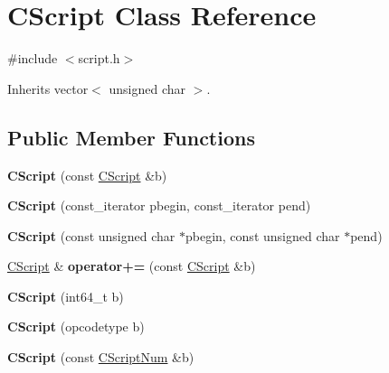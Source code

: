 \hypertarget{class_c_script}{}\section{C\+Script Class Reference}
\label{class_c_script}


{\ttfamily \#include $<$script.\+h$>$}



Inherits vector$<$ unsigned char $>$.

\subsection*{Public Member Functions}
\begin{DoxyCompactItemize}
\item 
\mbox{\label{class_c_script_a32037617a2648c826f3685d17a46d6cf}} 
{\bfseries C\+Script} (const \mbox{\hyperlink{class_c_script}{C\+Script}} \&b)
\item 
\mbox{\label{class_c_script_a06a47661695214630a2f41d4019b20f5}} 
{\bfseries C\+Script} (const\+\_\+iterator pbegin, const\+\_\+iterator pend)
\item 
\mbox{\label{class_c_script_aa8d9ad6ecd9662b423b73294783396ce}} 
{\bfseries C\+Script} (const unsigned char $\ast$pbegin, const unsigned char $\ast$pend)
\item 
\mbox{\label{class_c_script_af5c72a9c725a2c4f1432cc214d54cfd7}} 
\mbox{\hyperlink{class_c_script}{C\+Script}} \& {\bfseries operator+=} (const \mbox{\hyperlink{class_c_script}{C\+Script}} \&b)
\item 
\mbox{\label{class_c_script_a48cc35ec0c9119def402a7118e81cf00}} 
{\bfseries C\+Script} (int64\+\_\+t b)
\item 
\mbox{\label{class_c_script_a8214376dea81245d33a44a2ea7c2cdc3}} 
{\bfseries C\+Script} (opcodetype b)
\item 
\mbox{\label{class_c_script_a360223feeb0931931b8e8a5288dc4bd5}} 
{\bfseries C\+Script} (const \mbox{\hyperlink{class_c_script_num}{C\+Script\+Num}} \&b)
\item 
\mbox{\label{class_c_script_ab2348dd32f252c468f793ec290924603}} 

\end{DoxyCompactItemize}
